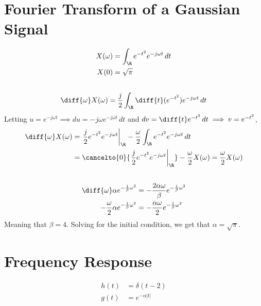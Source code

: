 \documentclass{article}
\begin{document}
\section{Fourier Transform of a Gaussian Signal}

\begin{align}
    X(\omega) &= \int_{\R} e^{-t^2} e^{-j \omega t} \, dt \\
    X(0) &= \sqrt{\pi}
\end{align}

\subsection{}

\begin{equation}
    \diff{\omega} X(\omega) = \frac{j}{2} \int_{\R} \diff{t} (e^{-t^2}) e^{-j \omega t} \, dt
\end{equation}
Letting \(u = e^{-j \omega t} \implies du = -j \omega e^{-j \omega t} \, dt\) and \(dv = \diff{t} e^{-t^2} \, dt \implies v = e^{-t^2}\),
\begin{align}
    \diff{\omega} X(\omega) &= \eval{\frac{j}{2} e^{-t^2} e^{-j \omega t}}_{\R} - \frac{\omega}{2} \int_{\R} e^{-t^2} e^{-j \omega t} \, dt \\
    &= \cancelto{0}{\eval{\frac{j}{2} e^{-t^2} e^{-j \omega t}}_{\R}} - \frac{\omega}{2} X(\omega) = \frac{\omega}{2} X(\omega)
\end{align}

\subsection{}

\begin{align}
    \diff{\omega} \alpha e^{-\frac{1}{\beta} \omega^2} &= -\frac{2 \alpha \omega}{\beta} e^{-\frac{1}{\beta} \omega^2} \\
    -\frac{\omega}{2} \alpha e^{-\frac{1}{\beta} \omega^2} &= -\frac{\alpha \omega}{2} e^{-\frac{1}{\beta} \omega^2}
\end{align}
Meaning that \(\beta = 4\).
Solving for the initial condition, we get that \(\alpha = \sqrt{\pi}\).

\section{Frequency Response}

\begin{align}
    h(t) &= \delta(t - 2) \\
    g(t) &= e^{-\alpha |t|}
\end{align}
\end{document}
